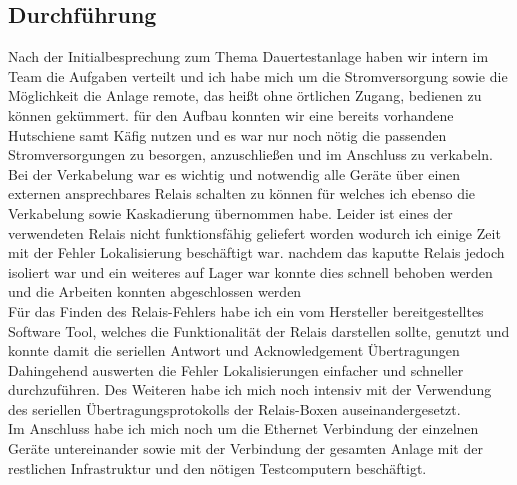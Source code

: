 \subsection{Durchführung}
Nach der Initialbesprechung zum Thema Dauertestanlage  haben wir intern im Team die Aufgaben verteilt und ich habe mich um die Stromversorgung sowie die Möglichkeit die Anlage remote, das heißt ohne örtlichen Zugang, bedienen zu können gekümmert.  für den Aufbau konnten wir eine bereits vorhandene Hutschiene samt Käfig nutzen und es war nur noch nötig  die passenden Stromversorgungen zu besorgen, anzuschließen und im Anschluss zu verkabeln.  \\
Bei der Verkabelung war es wichtig und notwendig alle Geräte über einen externen ansprechbares Relais schalten zu können für welches ich ebenso die Verkabelung sowie Kaskadierung übernommen habe. Leider  ist eines der verwendeten Relais nicht funktionsfähig geliefert worden wodurch ich einige Zeit mit der Fehler Lokalisierung beschäftigt war. nachdem das kaputte Relais jedoch isoliert war und ein weiteres auf Lager war konnte dies schnell behoben werden und die Arbeiten konnten abgeschlossen werden \\
Für das Finden des Relais-Fehlers habe ich ein vom Hersteller bereitgestelltes Software Tool, welches die Funktionalität der Relais darstellen sollte, genutzt und konnte damit die seriellen Antwort und Acknowledgement Übertragungen Dahingehend auswerten die Fehler Lokalisierungen einfacher und schneller durchzuführen. Des Weiteren habe ich mich noch intensiv mit der Verwendung des seriellen Übertragungsprotokolls der Relais-Boxen auseinandergesetzt. \\
Im Anschluss habe ich mich noch um die Ethernet Verbindung der einzelnen Geräte untereinander sowie mit der Verbindung der gesamten Anlage mit der restlichen Infrastruktur und den nötigen Testcomputern beschäftigt.  \\


